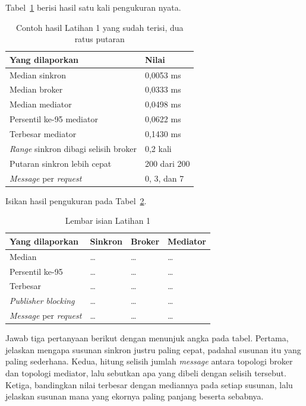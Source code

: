 Tabel~\ref{tab:lat1event-contoh} berisi hasil satu kali pengukuran nyata.

\begin{table}[htbp]
  \centering
  \caption{Contoh hasil Latihan 1 yang sudah terisi, dua ratus putaran}
  \label{tab:lat1event-contoh}
  \begin{tabularx}{\textwidth}{|X|l|}
    \hline
    \textbf{Yang dilaporkan} & \textbf{Nilai} \\
    \hline
    Median sinkron & 0,0053 ms \\
    \hline
    Median broker & 0,0333 ms \\
    \hline
    Median mediator & 0,0498 ms \\
    \hline
    Persentil ke-95 mediator & 0,0622 ms \\
    \hline
    Terbesar mediator & 0,1430 ms \\
    \hline
    \textit{Range} sinkron dibagi selisih broker & 0,2 kali \\
    \hline
    Putaran sinkron lebih cepat & 200 dari 200 \\
    \hline
    \textit{Message} per \textit{request} & 0, 3, dan 7 \\
    \hline
  \end{tabularx}
\end{table}

Isikan hasil pengukuran pada Tabel~\ref{tab:lat1event-hasil}.

\begin{table}[htbp]
  \centering
  \caption{Lembar isian Latihan 1}
  \label{tab:lat1event-hasil}
  \begin{tabularx}{\textwidth}{|X|l|l|l|}
    \hline
    \textbf{Yang dilaporkan} & \textbf{Sinkron} & \textbf{Broker} & \textbf{Mediator} \\
    \hline
    Median & \dots & \dots & \dots \\
    \hline
    Persentil ke-95 & \dots & \dots & \dots \\
    \hline
    Terbesar & \dots & \dots & \dots \\
    \hline
    \textit{Publisher blocking} & \dots & \dots & \dots \\
    \hline
    \textit{Message} per \textit{request} & \dots & \dots & \dots \\
    \hline
  \end{tabularx}
\end{table}

Jawab tiga pertanyaan berikut dengan menunjuk angka pada tabel. Pertama,
jelaskan mengapa susunan sinkron justru paling cepat, padahal susunan itu yang
paling sederhana. Kedua, hitung selisih jumlah \textit{message} antara topologi broker dan
topologi mediator, lalu sebutkan apa yang dibeli dengan selisih tersebut.
Ketiga, bandingkan nilai terbesar dengan mediannya pada setiap susunan, lalu
jelaskan susunan mana yang ekornya paling panjang beserta sebabnya.

